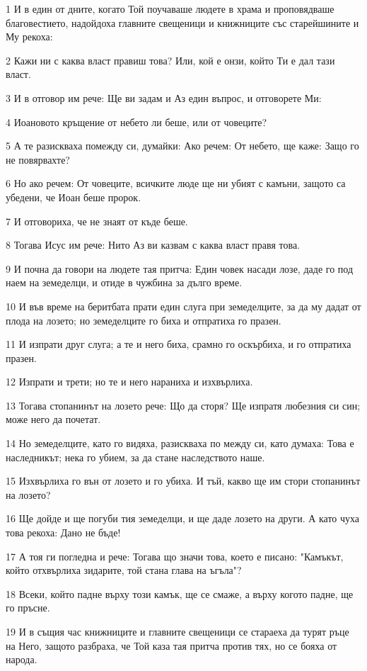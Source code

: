 \par 1 И в един от дните, когато Той поучаваше людете в храма и проповядваше благовестието, надойдоха главните свещеници и книжниците със старейшините и Му рекоха:
\par 2 Кажи ни с каква власт правиш това? Или, кой е онзи, който Ти е дал тази власт.
\par 3 И в отговор им рече: Ще ви задам и Аз един въпрос, и отговорете Ми:
\par 4 Иоановото кръщение от небето ли беше, или от човеците?
\par 5 А те разискваха помежду си, думайки: Ако речем: От небето, ще каже: Защо го не повярвахте?
\par 6 Но ако речем: От човеците, всичките люде ще ни убият с камъни, защото са убедени, че Иоан беше пророк.
\par 7 И отговориха, че не знаят от къде беше.
\par 8 Тогава Исус им рече: Нито Аз ви казвам с каква власт правя това.
\par 9 И почна да говори на людете тая притча: Един човек насади лозе, даде го под наем на земеделци, и отиде в чужбина за дълго време.
\par 10 И във време на беритбата прати един слуга при земеделците, за да му дадат от плода на лозето; но земеделците го биха и отпратиха го празен.
\par 11 И изпрати друг слуга; а те и него биха, срамно го оскърбиха, и го отпратиха празен.
\par 12 Изпрати и трети; но те и него нараниха и изхвърлиха.
\par 13 Тогава стопанинът на лозето рече: Що да сторя? Ще изпратя любезния си син; може него да почетат.
\par 14 Но земеделците, като го видяха, разискваха по между си, като думаха: Това е наследникът; нека го убием, за да стане наследството наше.
\par 15 Изхвърлиха го вън от лозето и го убиха. И тъй, какво ще им стори стопанинът на лозето?
\par 16 Ще дойде и ще погуби тия земеделци, и ще даде лозето на други. А като чуха това рекоха: Дано не бъде!
\par 17 А тоя ги погледна и рече: Тогава що значи това, което е писано: "Камъкът, който отхвърлиха зидарите, той стана глава на ъгъла"?
\par 18 Всеки, който падне върху този камък, ще се смаже, а върху когото падне, ще го пръсне.
\par 19 И в същия час книжниците и главните свещеници се стараеха да турят ръце на Него, защото разбраха, че Той каза тая притча против тях, но се бояха от народа.

